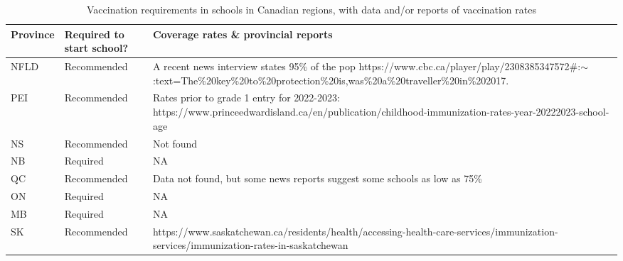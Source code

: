 \documentclass[12pt,a4paper]{article}
\begin{document}
\begin{table}[h!]
  \centering

  \caption[Vaccination requirements by province]{Vaccination requirements in schools in Canadian regions, with data and/or reports of vaccination rates}
  \label{tab:vaxrequire}
  \begin{tabular}{lp{3cm}p{10cm}}
	  \bf{Province} & \bf{Required to start school?} & \bf{Coverage rates \& provincial reports}                                                                                                                                                \\ \hline
NFLD     & Recommended               & A recent news interview states 95\% of the pop https://www.cbc.ca/player/play/2308385347572\#:$\sim$:text=The\%20key\%20to\%20protection\%20is,was\%20a\%20traveller\%20in\%202017. \\ \hline
PEI      & Recommended               & Rates prior to grade 1 entry for 2022-2023: https://www.princeedwardisland.ca/en/publication/childhood-immunization-rates-year-20222023-school-age                                  \\ \hline
NS       & Recommended               & Not found                                                                                                                                                                      \\ \hline
NB       & Required                  & NA                                                                                                                                                                                  \\ \hline
QC       & Recommended               & Data not found, but some news reports suggest some schools as low as 75\%                                                                                                                \\ \hline
ON       & Required                  & NA                                                                                                                                                                                  \\ \hline
MB       & Required                  & NA                                                                                                                                                                                  \\ \hline
SK       & Recommended               & https://www.saskatchewan.ca/residents/health/accessing-health-care-services/immunization-services/immunization-rates-in-saskatchewan                                                \\ \hline

\end{tabular}
\end{table}
\end{document}
